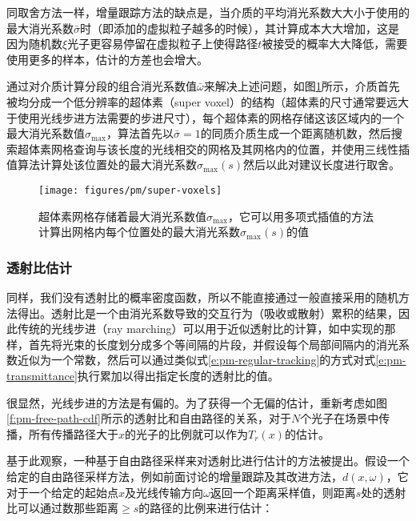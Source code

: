 同取舍方法一样，增量跟踪方法的缺点是，当介质的平均消光系数大大小于使用的最大消光系数$\bar{\sigma}$时（即添加的虚拟粒子越多的时候），其计算成本大大增加，这是因为随机数$\xi$光子更容易停留在虚拟粒子上使得路径$t$被接受的概率大大降低，需要使用更多的样本，估计的方差也会增大。

\cite{a:FreePathSamplinginHighResolutionInhomogeneousParticipatingMedia}通过对介质计算分段的组合消光系数值$\bar{\omega}$来解决上述问题，如图\ref{f:pm-super-voxels}所示，介质首先被均分成一个低分辨率的超体素（super voxel）的结构（超体素的尺寸通常要远大于使用光线步进方法需要的步进尺寸），每个超体素的网格存储这该区域内的一个最大消光系数值$\sigma_{\max}$，算法首先以$\bar{\sigma}=1$的同质介质生成一个距离随机数，然后搜索超体素网格查询与该长度的光线相交的网格及其网格内的位置，并使用三线性插值算法计算处该位置处的最大消光系数$\sigma_{\max}(s)$然后以此对建议长度进行取舍。

\begin{figure}
	\sidecaption
	\texttt{[image: figures/pm/super-voxels]}
	\caption{超体素网格存储着最大消光系数值$\sigma_{\max}$，它可以用多项式插值的方法计算出网格内每个位置处的最大消光系数$\sigma_{\max}(s)$的值}
	\label{f:pm-super-voxels}
\end{figure}





\subsubsection{透射比估计}
同样，我们没有透射比的概率密度函数，所以不能直接通过一般直接采用的随机方法得出。透射比是一个由消光系数导致的交互行为（吸收或散射）累积的结果，因此传统的光线步进（ray marching）可以用于近似透射比的计算，如\cite{a:AComprehensiveTheoryofVolumetricRadianceEstimationusingPhotonPointsandBeams}中实现的那样，首先将光束的长度划分成多个等间隔的片段，并假设每个局部间隔内的消光系数近似为一个常数，然后可以通过类似式\ref{e:pm-regular-tracking}的方式对式\ref{e:pm-transmittance}执行累加以得出指定长度的透射比的值。

很显然，光线步进的方法是有偏的。为了获得一个无偏的估计，重新考虑如图\ref{f:pm-free-path-cdf}所示的透射比和自由路径的关系，对于$N$个光子在场景中传播，所有传播路径大于$x$的光子的比例就可以作为$T_r(x)$的估计。

基于此观察，一种基于自由路径采样来对透射比进行估计的方法被提出。假设一个给定的自由路径采样方法，例如前面讨论的增量跟踪及其改进方法，$d(x,{\omega})$，它对于一个给定的起始点$x$及光线传输方向${\omega}$返回一个距离采样值，则距离$s$处的透射比可以通过数那些距离$\geq s$的路径的比例来进行估计：


